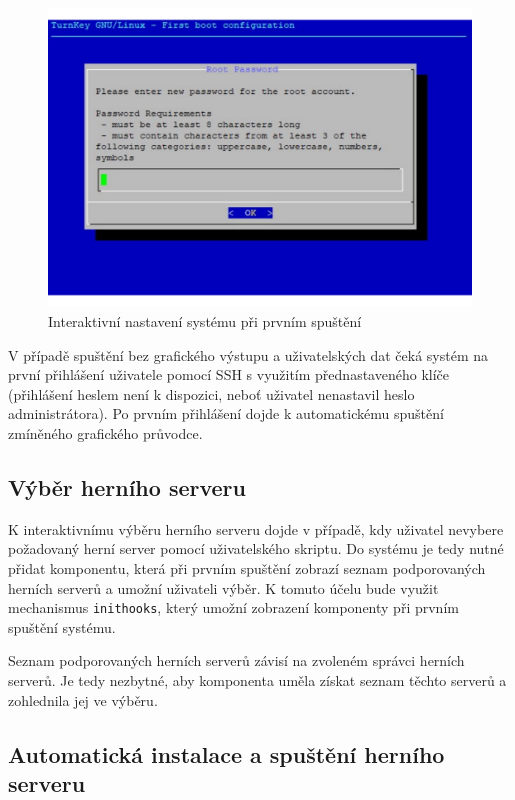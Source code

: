 \begin{figure}[h]
    \centering
    \includegraphics[width=1\linewidth]{chapters/images/root-pass.pdf}
    \caption{Interaktivní nastavení systému při prvním spuštění}
    \label{fig:inithooks-password}
\end{figure}

V případě spuštění bez grafického výstupu a uživatelských dat čeká systém na první přihlášení uživatele pomocí SSH s využitím přednastaveného klíče (přihlášení heslem
není k dispozici, neboť uživatel nenastavil heslo administrátora). Po prvním přihlášení dojde k automatickému spuštění zmíněného grafického průvodce.

\subsection{Výběr herního serveru}

K interaktivnímu výběru herního serveru dojde v případě, kdy uživatel nevybere požadovaný herní server pomocí uživatelského skriptu.
Do systému je tedy nutné přidat komponentu, která při prvním spuštění zobrazí seznam podporovaných herních serverů a umožní uživateli výběr.
K tomuto účelu bude využit mechanismus \texttt{inithooks}, který umožní zobrazení komponenty při prvním spuštění systému.

Seznam podporovaných herních serverů závisí na zvoleném správci herních serverů. Je tedy nezbytné, aby komponenta uměla získat seznam těchto serverů
a zohlednila jej ve výběru.

\subsection{Automatická instalace a spuštění herního serveru}

